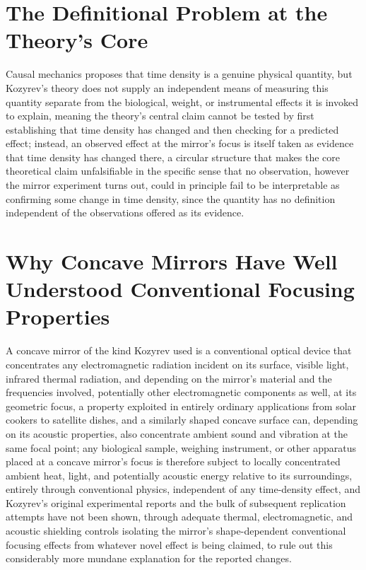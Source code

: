 \documentclass[11pt]{article}
\begin{document}
\section{The Definitional Problem at the Theory's Core}

Causal mechanics proposes that time density is a genuine physical quantity, but Kozyrev's theory does not supply an independent means of measuring this quantity separate from the biological, weight, or instrumental effects it is invoked to explain, meaning the theory's central claim cannot be tested by first establishing that time density has changed and then checking for a predicted effect; instead, an observed effect at the mirror's focus is itself taken as evidence that time density has changed there, a circular structure that makes the core theoretical claim unfalsifiable in the specific sense that no observation, however the mirror experiment turns out, could in principle fail to be interpretable as confirming some change in time density, since the quantity has no definition independent of the observations offered as its evidence.

\section{Why Concave Mirrors Have Well Understood Conventional Focusing Properties}

A concave mirror of the kind Kozyrev used is a conventional optical device that concentrates any electromagnetic radiation incident on its surface, visible light, infrared thermal radiation, and depending on the mirror's material and the frequencies involved, potentially other electromagnetic components as well, at its geometric focus, a property exploited in entirely ordinary applications from solar cookers to satellite dishes, and a similarly shaped concave surface can, depending on its acoustic properties, also concentrate ambient sound and vibration at the same focal point; any biological sample, weighing instrument, or other apparatus placed at a concave mirror's focus is therefore subject to locally concentrated ambient heat, light, and potentially acoustic energy relative to its surroundings, entirely through conventional physics, independent of any time-density effect, and Kozyrev's original experimental reports and the bulk of subsequent replication attempts have not been shown, through adequate thermal, electromagnetic, and acoustic shielding controls isolating the mirror's shape-dependent conventional focusing effects from whatever novel effect is being claimed, to rule out this considerably more mundane explanation for the reported changes.
\end{document}
